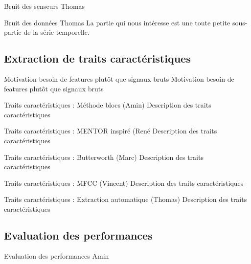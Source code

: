 \documentclass{beamer}
\begin{document}
\begin{frame}{Bruit des senseurs}
Thomas

\end{frame}

\begin{frame}{Bruit des données}
Thomas
La partie qui nous intéresse est une toute petite sous-partie de la série temporelle.
\end{frame}

\subsection[Extraction de traits caractéristiques]{Extraction de traits caractéristiques}

\begin{frame}{Motivation besoin de features plutôt que signaux bruts}
Motivation besoin de features plutôt que signaux bruts
\end{frame}

\begin{frame}{Traits caractéristiques : Méthode blocs (Amin)}
Description des traits caractéristiques
\end{frame}

\begin{frame}{Traits caractéristiques : MENTOR inspiré (René}
Description des traits caractéristiques
\end{frame}

\begin{frame}{Traits caractéristiques : Butterworth (Marc)}
Description des traits caractéristiques
\end{frame}

\begin{frame}{Traits caractéristiques : MFCC (Vincent)}
Description des traits caractéristiques
\end{frame}

\begin{frame}{Traits caractéristiques : Extraction automatique (Thomas)}
Description des traits caractéristiques
\end{frame}

\subsection[Evaluation des performances]{Evaluation des performances}

\begin{frame}{Evaluation des performances}
Amin

\end{frame}
\end{document}
